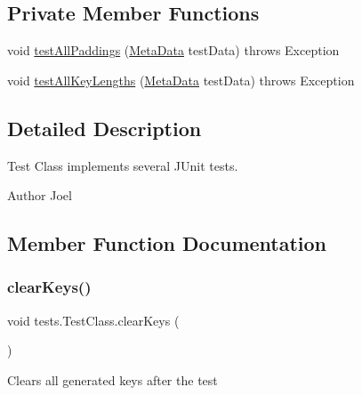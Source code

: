 \subsection*{Private Member Functions}
\begin{DoxyCompactItemize}
\item 
void \mbox{\hyperlink{classtests_1_1_test_class_ad9f19e80ff161cfedfbfe4ba527c0074}{test\+All\+Paddings}} (\mbox{\hyperlink{classpersistence_1_1_meta_data}{Meta\+Data}} test\+Data)  throws Exception     
\item 
void \mbox{\hyperlink{classtests_1_1_test_class_a8bf4e8d943fa1d61fbaa615dcefeca69}{test\+All\+Key\+Lengths}} (\mbox{\hyperlink{classpersistence_1_1_meta_data}{Meta\+Data}} test\+Data)  throws Exception     
\end{DoxyCompactItemize}


\subsection{Detailed Description}
Test Class implements several J\+Unit tests. \begin{DoxyAuthor}{Author}
Joel 
\end{DoxyAuthor}


\subsection{Member Function Documentation}
\mbox{\label{classtests_1_1_test_class_a76d4a21196ec5031baa7c7a42be58cb5}} 
\subsubsection{\texorpdfstring{clear\+Keys()}{clearKeys()}}
{\footnotesize\ttfamily void tests.\+Test\+Class.\+clear\+Keys (\begin{DoxyParamCaption}{ }\end{DoxyParamCaption})}

Clears all generated keys after the test \mbox{\label{classtests_1_1_test_class_a85be535c071d279d8d7bc1a40201dcff}} 
